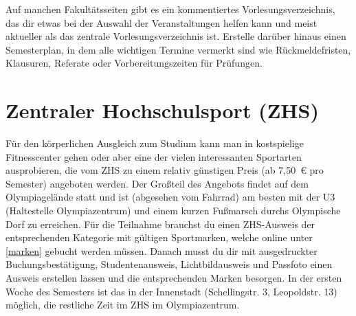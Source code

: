 Auf manchen Fakultätsseiten gibt es ein kommentiertes Vorlesungsverzeichnis, das dir etwas bei der Auswahl der Veranstaltungen helfen kann und meist aktueller als das zentrale Vorlesungsverzeichnis ist. Erstelle darüber hinaus einen Semesterplan, in dem alle wichtigen Termine vermerkt sind wie Rückmeldefristen, Klausuren, Referate oder Vorbereitungszeiten für Prüfungen.

\begin{urlList}
\end{urlList}

	




\section{Zentraler Hochschulsport (ZHS)}

Für den körperlichen Ausgleich zum Studium kann man in kostspielige
Fitnesscenter gehen oder aber eine der vielen interessanten Sportarten
ausprobieren, die vom ZHS zu einem relativ günstigen Preis (ab 7,50~€ pro
Semester) angeboten werden. Der Großteil des Angebots findet auf dem
Olympiagelände statt und ist (abgesehen vom Fahrrad) am besten mit der U3
(Haltestelle Olympiazentrum) und einem kurzen Fußmarsch durchs Olympische Dorf
zu erreichen. Für die Teilnahme brauchst du einen ZHS-Ausweis der
entsprechenden Kategorie mit gültigen Sportmarken, welche online unter
\ref{marken} gebucht werden müssen. Danach musst du dir mit ausgedruckter
Buchungsbestätigung, Studentenausweis, Lichtbildausweis und Passfoto einen
Ausweis erstellen lassen und die entsprechenden Marken besorgen. In der ersten
Woche des Semesters ist das in der Innenstadt (Schellingstr. 3, Leopoldstr. 13)
möglich, die restliche Zeit im ZHS im Olympiazentrum. 

